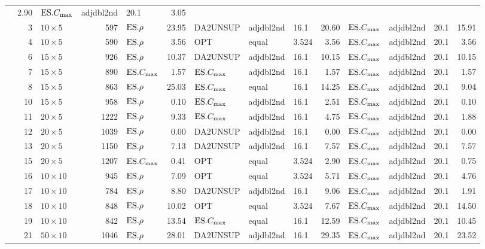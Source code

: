 {\begin{longtable}{l@{}rlr|l@{ }r|l@{ }l@{ }l@{ }r|l@{ }l@{ }l@{ }r}
  & 2.90 & $\text{ES}.{C_{\max}}$ & adjdbl2nd & 20.1 & 3.05 \\ 
  &3 & $10\times5$ & 597 & $\text{ES}.{\rho}$ & 23.95 & DA2UNSUP & adjdbl2nd & 
  16.1 & 20.60 & $\text{ES}.{C_{\max}}$ & adjdbl2nd & 20.1 & 15.91 \\ 
  &4 & $10\times5$ & 590 & $\text{ES}.{\rho}$ & 3.56 & OPT & equal & 3.524 & 3.56 
  & $\text{ES}.{C_{\max}}$ & adjdbl2nd & 20.1 & 3.56 \\ 
  &6 & $15\times5$ & 926 & $\text{ES}.{\rho}$ & 10.37 & DA2UNSUP & adjdbl2nd & 
  16.1 & 10.15 & $\text{ES}.{C_{\max}}$ & adjdbl2nd & 20.1 & 10.15 \\ 
  &7 & $15\times5$ & 890 & $\text{ES}.{C_{\max}}$ & 1.57 & $\text{ES}.{C_{\max}}$ & adjdbl2nd & 
  16.1 & 1.57 & $\text{ES}.{C_{\max}}$ & adjdbl2nd & 20.1 & 1.57 \\ 
  &8 & $15\times5$ & 863 & $\text{ES}.{\rho}$ & 25.03 & $\text{ES}.{C_{\max}}$ & equal & 16.1 
  & 14.25 & $\text{ES}.{C_{\max}}$ & adjdbl2nd & 20.1 & 9.04 \\ 
  &10 & $15\times5$ & 958 & $\text{ES}.{\rho}$ & 0.10 & $\text{ES}.{C_{\max}}$ & adjdbl2nd & 
  16.1 & 2.51 & $\text{ES}.{C_{\max}}$ & adjdbl2nd & 20.1 & 0.10 \\ 
  &11 & $20\times5$ & 1222 & $\text{ES}.{\rho}$ & 9.33 & $\text{ES}.{C_{\max}}$ & adjdbl2nd & 
  16.1 & 4.75 & $\text{ES}.{C_{\max}}$ & adjdbl2nd & 20.1 & 1.88 \\ 
  &12 & $20\times5$ & 1039 & $\text{ES}.{\rho}$ & 0.00 & DA2UNSUP & adjdbl2nd & 
  16.1 & 0.00 & $\text{ES}.{C_{\max}}$ & adjdbl2nd & 20.1 & 0.00 \\ 
  &13 & $20\times5$ & 1150 & $\text{ES}.{\rho}$ & 7.13 & DA2UNSUP & adjdbl2nd & 
  16.1 & 7.57 & $\text{ES}.{C_{\max}}$ & adjdbl2nd & 20.1 & 7.57 \\ 
  &15 & $20\times5$ & 1207 & $\text{ES}.{C_{\max}}$ & 0.41 & OPT & equal & 3.524 & 
  2.90 & $\text{ES}.{C_{\max}}$ & adjdbl2nd & 20.1 & 0.75 \\ 
  &16 & $10\times10$ & 945 & $\text{ES}.{\rho}$ & 7.09 & OPT & equal & 3.524 & 
  5.71 & $\text{ES}.{C_{\max}}$ & adjdbl2nd & 20.1 & 4.76 \\ 
  &17 & $10\times10$ & 784 & $\text{ES}.{\rho}$ & 8.80 & DA2UNSUP & adjdbl2nd & 
  16.1 & 9.06 & $\text{ES}.{C_{\max}}$ & adjdbl2nd & 20.1 & 1.91 \\ 
  &18 & $10\times10$ & 848 & $\text{ES}.{\rho}$ & 10.02 & OPT & equal & 3.524 & 
  7.67 & $\text{ES}.{C_{\max}}$ & adjdbl2nd & 20.1 & 14.50 \\ 
  &19 & $10\times10$ & 842 & $\text{ES}.{\rho}$ & 13.54 & $\text{ES}.{C_{\max}}$ & equal & 
  16.1 & 12.59 & $\text{ES}.{C_{\max}}$ & adjdbl2nd & 20.1 & 10.45 \\ 
  &21 & $50\times10$ & 1046 & $\text{ES}.{\rho}$ & 28.01 & DA2UNSUP & adjdbl2nd & 
  16.1 & 29.35 & $\text{ES}.{C_{\max}}$ & adjdbl2nd & 20.1 & 23.52 \\ 

\end{longtable}}
